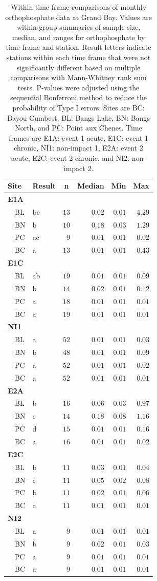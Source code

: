 \documentclass[letterpaper,12pt]{article}\usepackage[]{graphicx}\usepackage[]{color}
\begin{document}
\clearpage

\begin{table}[!tbp]
\caption{Within time frame comparisons of monthly orthophosphate data at Grand Bay.  Values are within-group summaries of sample size, median, and ranges for orthophosphate by time frame and station.  Result letters indicate stations within each time frame that were not significantly different based on multiple comparisons with Mann-Whitney rank sum tests.  P-values were adjusted using the sequential Bonferroni method to reduce the probability of Type I errors. Sites are BC: Bayou Cumbest, BL: Bangs Lake, BN: Bangs North, and PC: Point aux Chenes.  Time frames are E1A: event 1 acute, E1C: event 1 chronic, NI1: non-impact 1, E2A: event 2 acute, E2C: event 2 chronic, and NI2: non-impact 2.\label{tab:orthtab2}} 
\begin{center}
\begin{tabular}{llrrrr}
\hline\hline
\multicolumn{1}{l}{Site}&\multicolumn{1}{c}{Result}&\multicolumn{1}{c}{n}&\multicolumn{1}{c}{Median}&\multicolumn{1}{c}{Min}&\multicolumn{1}{c}{Max}\tabularnewline
\hline
{\bfseries E1A}&&&&&\tabularnewline
~~BL&bc&$13$&$0.02$&$0.01$&$4.29$\tabularnewline
~~BN&b&$10$&$0.18$&$0.03$&$1.29$\tabularnewline
~~PC&ac&$ 9$&$0.01$&$0.01$&$0.02$\tabularnewline
~~BC&a&$13$&$0.01$&$0.01$&$0.43$\tabularnewline
\hline
{\bfseries E1C}&&&&&\tabularnewline
~~BL&ab&$19$&$0.01$&$0.01$&$0.09$\tabularnewline
~~BN&b&$14$&$0.02$&$0.01$&$0.12$\tabularnewline
~~PC&a&$18$&$0.01$&$0.01$&$0.01$\tabularnewline
~~BC&a&$19$&$0.01$&$0.01$&$0.01$\tabularnewline
\hline
{\bfseries NI1}&&&&&\tabularnewline
~~BL&a&$52$&$0.01$&$0.01$&$0.03$\tabularnewline
~~BN&b&$48$&$0.01$&$0.01$&$0.09$\tabularnewline
~~PC&a&$52$&$0.01$&$0.01$&$0.02$\tabularnewline
~~BC&a&$52$&$0.01$&$0.01$&$0.01$\tabularnewline
\hline
{\bfseries E2A}&&&&&\tabularnewline
~~BL&b&$16$&$0.06$&$0.03$&$0.97$\tabularnewline
~~BN&c&$14$&$0.18$&$0.08$&$1.16$\tabularnewline
~~PC&d&$15$&$0.01$&$0.01$&$0.16$\tabularnewline
~~BC&a&$16$&$0.01$&$0.01$&$0.02$\tabularnewline
\hline
{\bfseries E2C}&&&&&\tabularnewline
~~BL&b&$11$&$0.03$&$0.01$&$0.04$\tabularnewline
~~BN&c&$11$&$0.05$&$0.02$&$0.08$\tabularnewline
~~PC&b&$11$&$0.02$&$0.01$&$0.06$\tabularnewline
~~BC&a&$11$&$0.01$&$0.01$&$0.01$\tabularnewline
\hline
{\bfseries NI2}&&&&&\tabularnewline
~~BL&a&$ 9$&$0.01$&$0.01$&$0.01$\tabularnewline
~~BN&b&$ 9$&$0.02$&$0.01$&$0.03$\tabularnewline
~~PC&a&$ 9$&$0.01$&$0.01$&$0.01$\tabularnewline
~~BC&a&$ 9$&$0.01$&$0.01$&$0.01$\tabularnewline
\hline
\end{tabular}\end{center}
\end{table}
\end{document}
